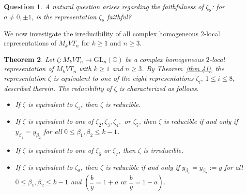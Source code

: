 \documentclass[preprint]{elsarticle}
\newtheorem{theorem}{Theorem}[section]
\newtheorem{question}[theorem]{Question}
\begin{document}
\begin{question}
A natural question arises regarding the faithfulness of $\zeta_8$: for $a \neq 0, \pm 1$, is the representation $\zeta_8$ faithful?
\end{question}


We now investigate the irreducibility of all complex homogeneous
$2$-local representations of $M_kVT_n$ for $k\geq 1$ and $n \ge 3$. 

\begin{theorem}
Let $
\zeta : M_kVT_n \longrightarrow \mathrm{GL}_n(\mathbb{C})$
be a complex homogeneous \(2\)-local representation of \(M_kVT_n\) with
$k\geq 1$ and $n \ge 3$. By Theorem~\ref{thm 41}, the representation $\zeta$ is equivalent to one of the eight
representations $\zeta_i$, $1 \le i \le 8$, described therein.
The reducibility of $\zeta$ is characterized as follows.
\begin{itemize}
    \item[(a)] If $\zeta$ is equivalent to $\zeta_1$, then $\zeta$ is reducible.
    \item[(b)] If $\zeta$ is equivalent to one of $\zeta_2, \zeta_3, \zeta_4,$ or $\zeta_5$,
    then $\zeta$ is reducible if and only if
    $y_{\beta_1}=y_{\beta_2}$ for all $0 \le \beta_1, \beta_2 \le k-1$.
    \item[(c)] If $\zeta$ is equivalent to one of $\zeta_6$ or $\zeta_7$,
    then $\zeta$ is irreducible.
    \item[(d)] If $\zeta$ is equivalent to $\zeta_8$, then $\zeta$ is reducible
    if and only if $y_{\beta_1}=y_{\beta_2}:=y$ for all $0 \le \beta_1, \beta_2 \le k-1$ and $\left( \dfrac{b}{y}=1+a \text{ \ or\ \  } \dfrac{b}{y}=1-a\right).$
\end{itemize}
\end{theorem}
\end{document}
